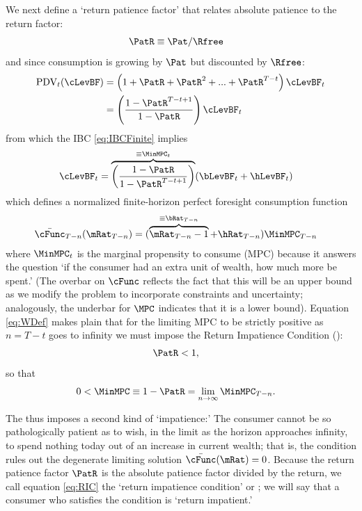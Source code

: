 \documentclass[BufferStockTheory]{subfiles}
\begin{document}
We next define a `return patience factor' that relates absolute patience to the return factor:
\begin{align}
  \PatR  & \equiv  {\Pat}/\Rfree \label{eq:PatR}
\end{align}
and since consumption is growing by $\Pat$ but discounted by $\Rfree$:
\begin{align}
  \text{PDV}_{t}(\cLevBF)  & = \left(1+\PatR+\PatR^{2}+...+ \PatR^{T-t}\right)\cLevBF_{t} \notag
  \\  & = \left(\frac{1-\PatR^{T-t+1}}{1-\PatR}\right)\cLevBF_{t}
\end{align}
from which the IBC \eqref{eq:IBCFinite} implies
\begin{align}
  \cLevBF_{t}  & = \overbrace{\left(\frac{1-\PatR}{1-\PatR^{T-t+1}}\right)}^{\equiv \MinMPC_{t}}
                 (\bLevBF_{t}+\hLevBF_{t})   \label{eq:WDef}
\end{align}
which defines a normalized finite-horizon perfect foresight consumption function
\begin{align}
  \bar{\cFunc}_{T-n}(\mRat_{T-n})  & = (\overbrace{\mRat_{T-n}-1}^{
                                     \equiv\bRat_{T-n}}+\hRat_{T-n})\MinMPC_{T-n}
\end{align}
where $\MinMPC_{t}$ is the marginal propensity to consume (MPC) because it answers the
question `if the consumer had an extra unit of wealth, how much more be spent.' \hypertarget{RIC}{}
(The overbar on $\cFunc$ reflects the fact that this will be an upper bound as we modify the problem to incorporate constraints and uncertainty; analogously, the underbar for $\MPC$ indicates that it is a lower bound).
Equation \eqref{eq:WDef} makes plain that for the limiting
MPC to be strictly positive as $n=T-t$ goes to infinity we must impose the Return Impatience Condition (\RIC):
\begin{align}
  \PatR  & < 1   \label{eq:RIC},
\end{align}
so that
\begin{align}
  0 <  \MinMPC  & \equiv   1-\PatR = \lim_{n \rightarrow \infty} \MinMPC_{T-n} \label{eq:MinMPCDef}
                  .
\end{align}


The {\RIC} thus imposes a second kind of `impatience:' The consumer cannot be so pathologically patient as to wish, in the limit as the horizon approaches infinity, to spend nothing today out of an increase in current wealth; that is, the condition rules out the degenerate limiting solution $\bar{\cFunc}(\mRat)=0$.  Because the return patience factor $\PatR$ is the absolute patience factor divided by the return, we call equation \eqref{eq:RIC} the `return impatience condition' or \RIC; we will say that a consumer who satisfies the condition is `return impatient.'
\end{document}
